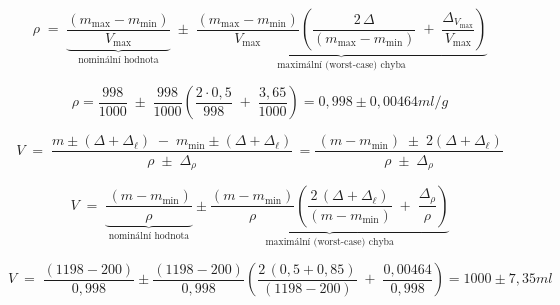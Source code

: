 \begin{equation}
\rho \;=\;
\underbrace{
\frac{(m_{\max}-m_{\min})}{V_{\max}}
}_{\text{nominální hodnota}}
\;\pm\;
\underbrace{
\frac{(m_{\max}-m_{\min})}{V_{\max}}
\left(
   \frac{2\,\Delta}{(m_{\max}-m_{\min})} \;+\; \frac{\Delta_{V_{\max}}}{V_{\max}}
\right)
}_{\text{maximální (worst-case) chyba}}
     \label{objem_kapasdalina}
\end{equation}

\begin{equation}
\rho = \frac{998}{1000}
\;\pm\;
\frac{998}{1000}
\left(
   \frac{2 \cdot 0,5}{998} \;+\; \frac{3,65}{1000}
\right) = 0,998 \pm 0,00464 ml/g
     \label{objem_kapasdalina}
\end{equation}

\begin{equation}
V \;=\;
\frac{m \pm (\Delta + \Delta_\ell) \;-\; m_{\min} \pm (\Delta + \Delta_\ell)}
     {\rho \;\pm\; \Delta_\rho}\, = 
\frac{\,(m-m_{\min}) \;\pm\; 2(\Delta + \Delta_\ell)}
     {\rho \;\pm\; \Delta_\rho}
 \end{equation}

 \begin{equation}
V \;=\;
\underbrace{
\frac{\,(m-m_{\min})}
     {\rho} 
 }_{\text{nominální hodnota}}
 \pm
 \underbrace{
 \frac{(m-m_{\min})}{\rho}
\left(
   \frac{2\,(\Delta+\Delta_\ell)}{(m-m_{\min})} \;+\; \frac{\Delta_\rho}{\rho}
\right)
}_{\text{maximální (worst-case) chyba}}
 \end{equation}

 \begin{equation}
V \;=\;
\frac{(1198-200)}{0,998}
\pm
 \frac{(1198-200)}{0,998}
\left(
   \frac{2\,(0,5+0,85)}{(1198-200)} \;+\; \frac{0,00464}{0,998}
\right) = 1000 \pm 7,35 ml
 \end{equation}



